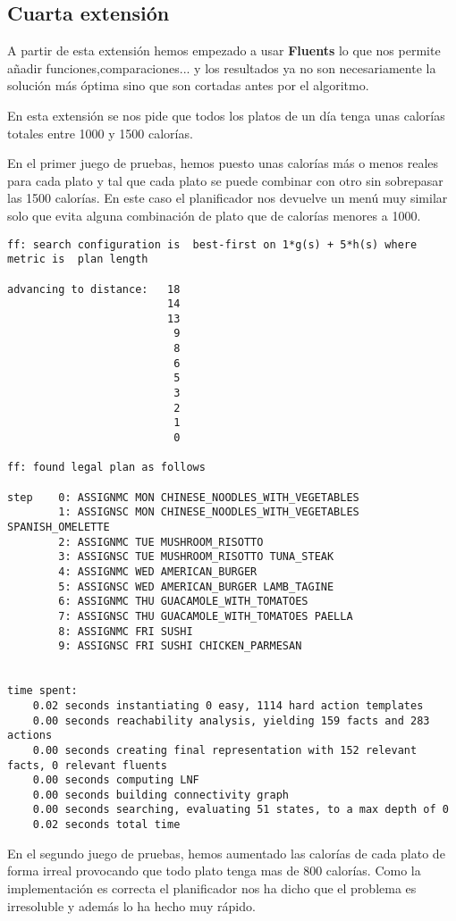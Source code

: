 \documentclass{article}
\begin{document}
\subsection{Cuarta extensión}
A partir de esta extensión hemos empezado a usar \textbf{Fluents} lo que nos permite añadir funciones,comparaciones... y los resultados ya no son necesariamente la solución más óptima sino que son cortadas antes por el algoritmo.
\par
En esta extensión se nos pide que todos los platos de un día tenga unas calorías totales entre 1000 y 1500 calorías.
\par
En el primer juego de pruebas, hemos puesto unas calorías más o menos reales para cada plato y tal que cada plato se puede combinar con otro sin sobrepasar las 1500 calorías. En este caso el planificador nos devuelve un menú muy similar solo que evita alguna combinación de plato que de calorías menores a 1000.
\begin{lstlisting}[language=none]
ff: search configuration is  best-first on 1*g(s) + 5*h(s) where metric is  plan length

advancing to distance:   18
                         14
                         13
                          9
                          8
                          6
                          5
                          3
                          2
                          1
                          0

ff: found legal plan as follows

step    0: ASSIGNMC MON CHINESE_NOODLES_WITH_VEGETABLES
        1: ASSIGNSC MON CHINESE_NOODLES_WITH_VEGETABLES SPANISH_OMELETTE
        2: ASSIGNMC TUE MUSHROOM_RISOTTO
        3: ASSIGNSC TUE MUSHROOM_RISOTTO TUNA_STEAK
        4: ASSIGNMC WED AMERICAN_BURGER
        5: ASSIGNSC WED AMERICAN_BURGER LAMB_TAGINE
        6: ASSIGNMC THU GUACAMOLE_WITH_TOMATOES
        7: ASSIGNSC THU GUACAMOLE_WITH_TOMATOES PAELLA
        8: ASSIGNMC FRI SUSHI
        9: ASSIGNSC FRI SUSHI CHICKEN_PARMESAN


time spent:
    0.02 seconds instantiating 0 easy, 1114 hard action templates
    0.00 seconds reachability analysis, yielding 159 facts and 283 actions
    0.00 seconds creating final representation with 152 relevant facts, 0 relevant fluents
    0.00 seconds computing LNF
    0.00 seconds building connectivity graph
    0.00 seconds searching, evaluating 51 states, to a max depth of 0
    0.02 seconds total time
\end{lstlisting}
En el segundo juego de pruebas, hemos aumentado las calorías de cada plato de forma irreal provocando que todo plato tenga mas de 800 calorías. Como la implementación es correcta el planificador nos ha dicho que el problema es irresoluble y además lo ha hecho muy rápido.
\end{document}
